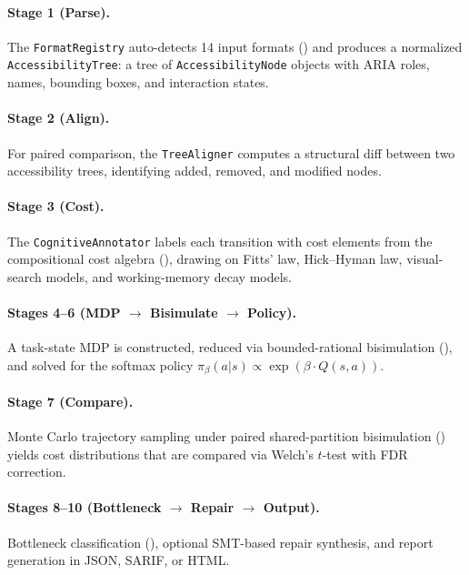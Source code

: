 \documentclass[11pt,twocolumn]{article}
\theoremstyle{definition}
\begin{document}
\paragraph{Stage 1 (Parse).}
The \texttt{FormatRegistry} auto-detects 14 input formats () and produces a normalized \texttt{AccessibilityTree}: a tree of \texttt{AccessibilityNode} objects with ARIA roles, names, bounding boxes, and interaction states.

\paragraph{Stage 2 (Align).}
For paired comparison, the \texttt{TreeAligner} computes a structural diff between two accessibility trees, identifying added, removed, and modified nodes.

\paragraph{Stage 3 (Cost).}
The \texttt{CognitiveAnnotator} labels each transition with cost elements from the compositional cost algebra (), drawing on Fitts' law, Hick--Hyman law, visual-search models, and working-memory decay models.

\paragraph{Stages 4--6 (MDP $\to$ Bisimulate $\to$ Policy).}
A task-state MDP is constructed, reduced via bounded-rational bisimulation (), and solved for the softmax policy $\pi_\beta(a|s) \propto \exp(\beta \cdot Q(s,a))$.

\paragraph{Stage 7 (Compare).}
Monte Carlo trajectory sampling under paired shared-partition bisimulation () yields cost distributions that are compared via Welch's $t$-test with FDR correction.

\paragraph{Stages 8--10 (Bottleneck $\to$ Repair $\to$ Output).}
Bottleneck classification (), optional SMT-based repair synthesis, and report generation in JSON, SARIF, or HTML.
\end{document}
